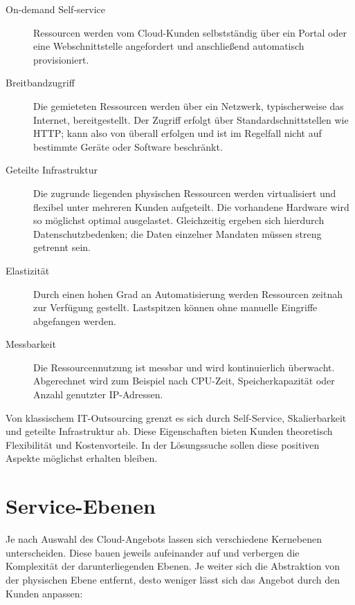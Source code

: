 \begin{description}
	
	\item[On-demand Self-service] Ressourcen werden vom Cloud-Kunden selbstständig über ein Portal oder eine Webschnittstelle angefordert und anschließend automatisch provisioniert. %
	
	\item[Breitbandzugriff] Die gemieteten Ressourcen werden über ein Netzwerk, typischerweise das Internet, bereitgestellt. Der Zugriff erfolgt über Standardschnittstellen wie HTTP; kann also von überall erfolgen und ist im Regelfall nicht auf bestimmte Geräte oder Software beschränkt.
	
	\item[Geteilte Infrastruktur] Die zugrunde liegenden physischen Ressourcen werden virtualisiert und flexibel unter mehreren Kunden aufgeteilt. Die vorhandene Hardware wird so möglichst optimal ausgelastet. Gleichzeitig ergeben sich hierdurch Datenschutzbedenken; die Daten einzelner Mandaten müssen streng getrennt sein.
	
	\item[Elastizität] Durch einen hohen Grad an Automatisierung werden Ressourcen zeitnah zur Verfügung gestellt. Lastspitzen können ohne manuelle Eingriffe abgefangen werden.
	
	\item[Messbarkeit] Die Ressourcennutzung ist messbar und wird kontinuierlich überwacht. Abgerechnet wird zum Beispiel nach CPU-Zeit, Speicherkapazität oder Anzahl genutzter IP-Adressen.
	
\end{description}

\noindent Von klassischem IT-Outsourcing grenzt es sich durch Self-Service, Skalierbarkeit und geteilte Infrastruktur ab. Diese Eigenschaften bieten Kunden theoretisch Flexibilität und Kostenvorteile. In der Lösungssuche sollen diese positiven Aspekte möglichst erhalten bleiben.


\section{Service-Ebenen}

Je nach Auswahl des Cloud-Angebots lassen sich verschiedene Kernebenen unterscheiden. Diese bauen jeweils aufeinander auf und verbergen die Komplexität der darunterliegenden Ebenen. Je weiter sich die Abstraktion von der physischen Ebene entfernt, desto weniger lässt sich das Angebot durch den Kunden anpassen:

